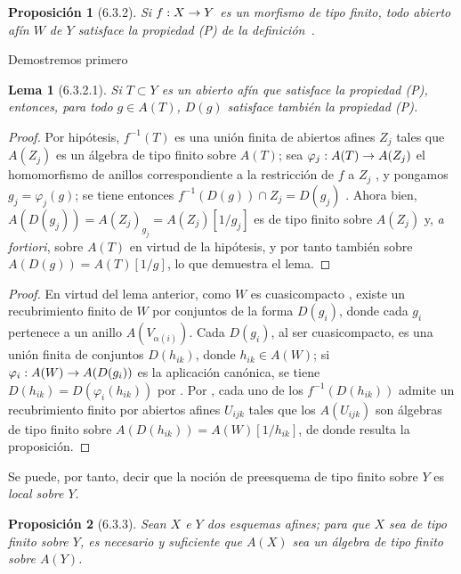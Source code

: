 \documentclass[oneside]{amsart}
\theoremstyle{ega-env-style}
\theoremstyle{ega-thm-env-style}
\newtheorem*{proposition}{Proposición}
\newtheorem*{lemma}{Lema}
\theoremstyle{ega-defn-env-style}
\renewcommand{\to}{\mathchoice{\longrightarrow}{\rightarrow}{\rightarrow}{\rightarrow}}
\newcommand{\oldpage}[2][]{{\marginnote{\normalfont{\textbf{#1}~|~#2}}}\ignorespaces}
\let\EGAOriginalLabel\label
\renewcommand{\label}[1]{\phantomsection\EGAOriginalLabel{#1}}
\newcommand{\erratum}[2][]{{#2}\marginpar{\footnotesize\textbf{Err}\textsubscript{#1}}}
\begin{document}
\begin{proposition}[6.3.2]
\label{I.6.3.2}
Si $f:X\to Y$ es un morfismo de tipo finito, todo abierto afín $W$ de $Y$ satisface la propiedad \emph{(P)} de la definición~.
\end{proposition}

Demostremos primero
\begin{lemma}[6.3.2.1]
\label{I.6.3.2.1}
Si $T\subset Y$ es un abierto afín que satisface la propiedad \emph{(P)}, entonces, para todo $g\in A(T)$, $D(g)$ satisface también la propiedad \emph{(P)}.
\end{lemma}

\begin{proof}
Por hipótesis, $f^{-1}(T)$ es una unión finita de abiertos afines $Z_j$ tales que $A(Z_j)$ es un álgebra de tipo finito sobre $A(T)$;
sea $\varphi_j:A(T)\to A(Z_j)$ el homomorfismo de anillos correspondiente a la restricción de $f$ a $Z_j$ , y pongamos $g_j=\varphi_j(g)$;
se tiene entonces $f^{-1}(D(g))\cap Z_j=D(g_j)$ .
Ahora bien, $A(D(g_j))=A(Z_j)_{g_j}=A(Z_j)[1/g_j]$ es de tipo finito sobre $A(Z_j)$ y, \emph{a fortiori}, sobre $A(T)$ en virtud de la hipótesis, y por tanto también sobre $A(D(g))=A(T)[1/g]$, lo que demuestra el lema.
\end{proof}

\begin{proof}
En virtud del lema anterior, como $W$ es cuasicompacto , existe un recubrimiento finito de $W$ por conjuntos de la forma \erratum[II]{$D(g_i)$}, donde cada $g_i$ pertenece a un anillo $A(V_{\alpha(i)})$.
Cada $D(g_i)$, al ser cuasicompacto, es una unión finita de conjuntos $D(h_{ik})$, donde $h_{ik}\in A(W)$;
si $\varphi_i:A(W)\to A(D(g_i))$ es la aplicación canónica, se tiene $D(h_{ik})=D(\varphi_i(h_{ik}))$ por .
Por , cada uno de los $f^{-1}(D(h_{ik}))$ admite un recubrimiento finito por abiertos afines $U_{ijk}$ tales que los $A(U_{ijk})$ son álgebras de tipo finito sobre $A(D(h_{ik}))=A(W)[1/h_{ik}]$, de donde resulta la proposición.
\end{proof}

\oldpage[I]{145}
Se puede, por tanto, decir que la noción de preesquema de tipo finito sobre $Y$ es \emph{local sobre $Y$}.

\begin{proposition}[6.3.3]
\label{I.6.3.3}
Sean $X$ e $Y$ dos esquemas afines;
para que $X$ sea de tipo finito sobre $Y$, es necesario y suficiente que $A(X)$ sea un álgebra de tipo finito sobre $A(Y)$.
\end{proposition}
\end{document}
